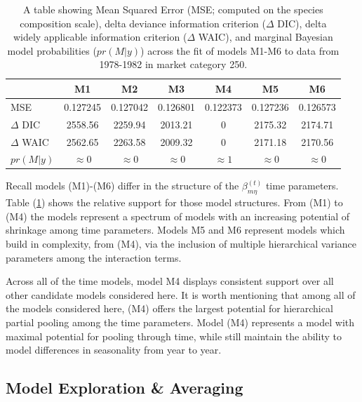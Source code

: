 \documentclass[12pt]{article}
\begin{document}
\begin{table}[h!]
\centering
\begin{tabular}[c]{@{}lcccccc@{}}
\hline
& M1 & M2 & M3 & M4 & M5 & M6 \\ \hline
MSE & 0.127245 & 0.127042 & 0.126801 & 0.122373 & 0.127236 & 0.126573 \\ %
\(\Delta\) DIC & 2558.56 & 2259.94 & 2013.21 & 0 & 2175.32 & 2174.71 \\ %
\(\Delta\) WAIC & 2562.65 & 2263.58 & 2009.32 & 0 & 2171.18 & 2170.56 \\ %
\(pr(M|y)\) & \(\approx0\) & \(\approx0\) & \(\approx0\) & \(\approx1\) & \(\approx0\) & \(\approx0\) \\ \hline
\end{tabular}
\caption{A table showing Mean Squared Error (MSE; computed on the species
composition scale), delta deviance information criterion (\(\Delta\) DIC),
delta widely applicable information criterion (\(\Delta\) WAIC), and marginal
Bayesian model probabilities (\(pr(M|y)\)) across the fit of models M1-M6 to 
data from 1978-1982 in market category 250.}
\label{priorTab}
\end{table}

Recall models (M1)-(M6) differ in the structure of the \(\beta^{(t)}_{m\eta}\) 
time parameters. Table (\ref{priorTab}) shows the relative support for those 
model structures. From (M1) to (M4) the models represent a spectrum of models 
with an increasing potential of shrinkage among time parameters. Models 
M5 and M6 represent models which build in complexity, from (M4), via 
the inclusion of multiple hierarchical variance parameters among 
the interaction terms.

Across all of the time models, model M4 displays consistent support over
all other candidate models considered here. It is worth mentioning that
among all of the models considered here, (M4) offers the largest
potential for hierarchical partial pooling among the time parameters.
Model (M4) represents a model with maximal potential for pooling through
time, while still maintain the ability to model differences in
seasonality from year to year.

\subsection{Model Exploration \& Averaging}\label{model-exploration-averaging-1}
\end{document}
